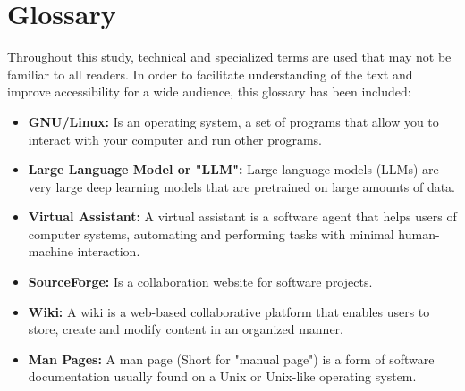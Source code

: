 \chapter*{Glossary}
Throughout this study, technical and specialized terms are used that may not be familiar to all readers. In order to facilitate understanding of the text and improve accessibility for a wide audience, this glossary has been included:
\begin{itemize}
	\item \textbf{GNU/Linux:} Is an operating system, a set of programs that allow you to interact with your computer and run other programs.
	\item \textbf{Large Language Model or "LLM":} Large language models (LLMs) are very large deep learning models that are pretrained on large amounts of data.
	\item \textbf{Virtual Assistant:} A virtual assistant is a software agent that helps users of computer systems, automating and performing tasks with minimal human-machine interaction.
	\item \textbf{SourceForge:} Is a collaboration website for software projects.
	\item \textbf{Wiki:} A wiki is a web-based collaborative platform that enables users to store, create and modify content in an organized manner.
	\item \textbf{Man Pages:} A man page (Short for "manual page") is a form of software documentation usually found on a Unix or Unix-like operating system.
\end{itemize}
